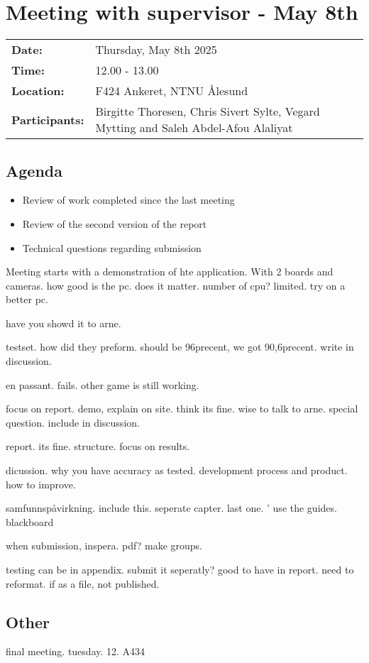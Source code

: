 \section{Meeting with supervisor - May 8th}
\begin{tabular}{ll}
    \textbf{Date:} & Thursday, May 8th 2025 \\
    \textbf{Time:} & 12.00 - 13.00\\
    \textbf{Location:} & F424 Ankeret, NTNU Ålesund \\
    \textbf{Participants:} & Birgitte Thoresen, Chris Sivert Sylte, Vegard Mytting and Saleh Abdel-Afou Alaliyat\\
\end{tabular}

\vspace{0.5cm}

\subsection{Agenda}

\begin{itemize} 
    \item Review of work completed since the last meeting
    \item Review of the second version of the report
    \item Technical questions regarding submission
\end{itemize}

Meeting starts with a demonstration of hte application. With 2 boards and cameras. how good is the pc. does it matter. number of cpu? limited. try on a better pc. 

have you showd it to arne. 

testset. how did they preform. should be 96precent, we got 90,6precent. write in discussion.

en passant. fails. other game is still working.

focus on report. demo, explain on site. think its fine. wise to talk to arne. special question. include in discussion. 

report. its fine. structure. focus on results. 

dicussion. why you have accuracy as tested. development process and product. how to improve. 

samfunnspåvirkning. include this. seperate capter. last one.
'
use the guides. blackboard

when submission, inspera. pdf? make groups. 


testing can be in appendix. submit it seperatly? good to have in report. need to reformat. if as a file, not published. 

\subsection{Other}
final meeting. tuesday. 12. A434